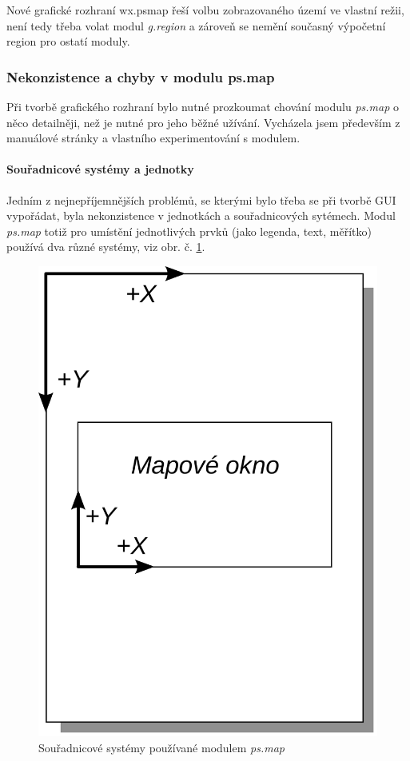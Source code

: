 \documentclass[a4paper,12pt,draft]{article}
\newcommand{\modul}[1]{\emph{#1}}
\begin{document}
Nové grafické rozhraní wx.psmap řeší volbu zobrazovaného území ve vlastní režii, není tedy třeba volat modul \modul{g.region} a zároveň se nemění současný výpočetní region pro ostatí moduly. %

\subsubsection{Nekonzistence a chyby v modulu ps.map}
\label{sec:psmap:chyby}
Při tvorbě grafického rozhraní bylo nutné prozkoumat chování modulu \modul{ps.map} o něco detailněji, než je nutné pro jeho běžné užívání. Vycházela jsem především z manuálové stránky \cite{manual} a vlastního experimentování s modulem. 

\paragraph*{Souřadnicové systémy a jednotky}
\label{sec:psmap:sour_systemy}
Jedním z nejnepříjemnějších problémů, se kterými bylo třeba se při tvorbě GUI vypořádat, byla nekonzistence v jednotkách a souřadnicových sytémech. Modul \modul{ps.map} totiž pro umístění jednotlivých prvků (jako legenda, text, měřítko) používá dva různé systémy, viz obr. č. \ref{fig:sour_systemy}.

\begin{figure}[h!]
    \centering
    \includegraphics[width=0.2\textheight]{sour_systemy.pdf}
    \caption{Souřadnicové systémy používané modulem \modul{ps.map}\label{fig:sour_systemy}}
\end{figure}
\end{document}

